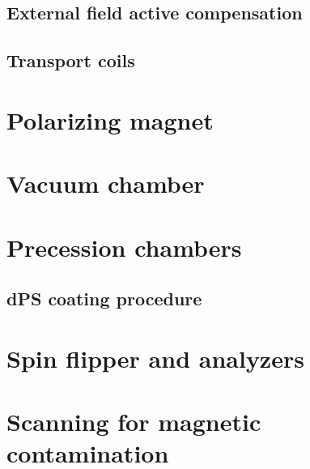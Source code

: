 

\subsection{External field active compensation}



\subsection{Transport coils}



\section{Polarizing magnet}\label{sec:PM_description}



\section{Vacuum chamber}



\section{Precession chambers}\label{sec:precession_chambers}



\subsection{dPS coating procedure}





\section{Spin flipper and analyzers}\label{sec:spin_flipper_analyzer}



\section{Scanning for magnetic contamination}

